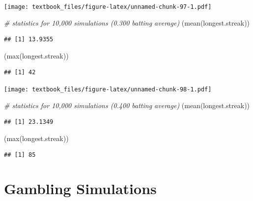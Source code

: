 \documentclass[
  11pt,
]{book}
\newenvironment{Shaded}{\begin{snugshade}}{\end{snugshade}}
\newcommand{\CommentTok}[1]{\textcolor[rgb]{0.56,0.35,0.01}{\textit{#1}}}
\newcommand{\FunctionTok}[1]{\textcolor[rgb]{0.00,0.00,0.00}{#1}}
\newcommand{\NormalTok}[1]{#1}
\theoremstyle{definition}
\theoremstyle{definition}
\theoremstyle{definition}
\theoremstyle{definition}
\theoremstyle{remark}
\begin{document}
\texttt{[image: textbook\_files/figure-latex/unnamed-chunk-97-1.pdf]}

\begin{Shaded}
\begin{Highlighting}[]
\CommentTok{\# statistics for 10,000 simulations (0.300 batting average)}
\NormalTok{(}\FunctionTok{mean}\NormalTok{(longest.streak))}
\end{Highlighting}
\end{Shaded}

\begin{verbatim}
## [1] 13.9355
\end{verbatim}

\begin{Shaded}
\begin{Highlighting}[]
\NormalTok{(}\FunctionTok{max}\NormalTok{(longest.streak))}
\end{Highlighting}
\end{Shaded}

\begin{verbatim}
## [1] 42
\end{verbatim}

\vfill
\newpage

\texttt{[image: textbook\_files/figure-latex/unnamed-chunk-98-1.pdf]}

\begin{Shaded}
\begin{Highlighting}[]
\CommentTok{\# statistics for 10,000 simulations (0.400 batting average)}
\NormalTok{(}\FunctionTok{mean}\NormalTok{(longest.streak))}
\end{Highlighting}
\end{Shaded}

\begin{verbatim}
## [1] 23.1349
\end{verbatim}

\begin{Shaded}
\begin{Highlighting}[]
\NormalTok{(}\FunctionTok{max}\NormalTok{(longest.streak))}
\end{Highlighting}
\end{Shaded}

\begin{verbatim}
## [1] 85
\end{verbatim}

\newpage

\hypertarget{gambling-simulations}{%
\section{Gambling Simulations}\label{gambling-simulations}}
\end{document}
